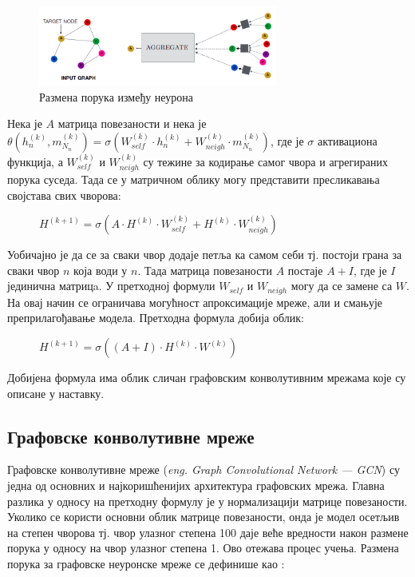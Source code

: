 \documentclass[11pt,oneside]{memoir}
\begin{document}
\begin{figure}[H]
  \centering
  \includegraphics[width=0.7\textwidth]{images/nmp.png}
  \caption{Размена порука између неурона\protect\footnotemark \label{nmp}}
\end{figure}


Нека је $A$ матрица повезаности и нека је $\theta (h^{(k)}_n, m^{(k)}_{N_{n}}) = \sigma (W^{(k)}_{self}\cdot h^{(k)}_n + W^{(k)}_{neigh}\cdot m^{(k)}_{N_{n}})$,
где је $\sigma$ активациона функција, а $W^{(k)}_{self}$ и $W^{(k)}_{neigh}$ су тежине за кодирање самог чвора и агрегираних порука суседа. Тада се у матричном облику
могу представити пресликавања својстава свих чворова:

\begin{figure}[H]
  \centering
  $H^{(k+1)} = \sigma (A\cdot H^{(k)}\cdot W^{(k)}_{self} + H^{(k)}\cdot W^{(k)}_{neigh})$
\end{figure}

Уобичајно је да се за сваки чвор додаје петља ка самом себи тј. постоји грана за сваки чвор $n$ која води у $n$. Тада матрица повезаности $A$
постаје $A+I$, где је $I$ јединична матрицa. У претходној формули $W_{self}$ и $W_{neigh}$ могу да се замене са $W$. На овај начин се 
ограничава могућност апроксимације мреже, али и смањује преприлагођавање модела. Претходна формула добија облик:

\begin{figure}[H]
  \centering
  $H^{(k+1)} = \sigma ((A+I)\cdot H^{(k)}\cdot W^{(k)})$
\end{figure}

Добијена формула има облик сличан графовским конволутивним мрежама које су описане у наставку.

\subsection{Графовске конволутивне мреже}

Графовске конволутивне мреже (\textit{eng. Graph Convolutional Network --- GCN}) су једна од основних и најкоришћенијих архитектура графовских мрежа.
Главна разлика у односу на претходну формулу је у нормализацији матрице повезаности. Уколико се користи основни облик матрице повезаности,
онда је модел осетљив на степен чворова тј. чвор улазног степена 100 даје веће вредности након размене порука у односу на чвор улазног степена 1.
Ово отежава процес учења. Размена порука за графовске неуронске мреже се дефинише као \cite{grl}:
\end{document}
